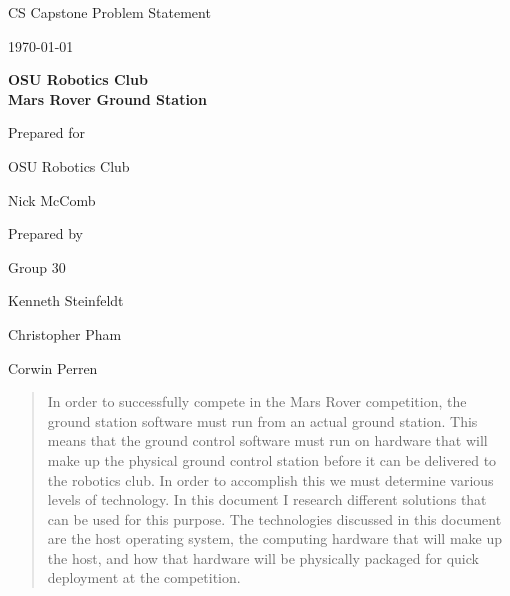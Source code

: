 \documentclass[onecolumn, draftclsnofoot, 10pt, compsoc]{IEEEtran}
\def \CapstoneTeamName{			}
\def \CapstoneTeamNumber{		30}
\def \GroupMemberOne{			Kenneth Steinfeldt}
\def \GroupMemberTwo{			Christopher Pham}
\def \GroupMemberThree{			Corwin Perren}
\def \CapstoneProjectName{		OSU Robotics Club\\Mars Rover Ground Station}
\def \CapstoneSponsorCompany{	OSU Robotics Club}
\def \CapstoneSponsorPerson{	Nick McComb}
\def \DocType{	Problem Statement
			 }
\newcommand{\NameSigPair}[1]{
  \par
  \makebox[2.75in][r]{#1} 
  \hfill
  \makebox[3.25in]{
      \makebox[2.25in]{\hrulefill} 
      \hfill
      \makebox[.75in]{\hrulefill}
  }
  \par\vspace{-12pt} 
  \textit{
      \tiny\noindent
      \makebox[2.75in]{} 
      \hfill
      \makebox[3.25in]{
          \makebox[2.25in][r]{Signature} 
          \hfill
          \makebox[.75in][r]{Date}
      }
  }
}
\renewcommand{\NameSigPair}[1]{#1}
\begin{document}
\begin{titlepage}
\begin{singlespace}
		\par\vspace{.35in}
		\centering
		\scshape{
			\huge CS Capstone \DocType \par
			{\large\today}\par
			\vspace{.5in}
			\textbf{\Huge\CapstoneProjectName}\par
			\vfill
			{\large Prepared for}\par
			\Huge \CapstoneSponsorCompany\par
			\vspace{5pt}
			{\Large\NameSigPair{\CapstoneSponsorPerson}\par}
			{\large Prepared by }\par
			Group\CapstoneTeamNumber\par
			\vspace{5pt}
			{\Large
				\NameSigPair{\GroupMemberOne}\par
				\NameSigPair{\GroupMemberTwo}\par
				\NameSigPair{\GroupMemberThree}\par
			}
			\vspace{20pt}
		}
		\begin{abstract}
            In order to successfully compete in the Mars Rover competition, the ground station software must run from an actual ground station.
            This means that the ground control software must run on hardware that will make up the physical ground control station before it can be delivered to the robotics club.
            In order to accomplish this we must determine various levels of technology.
            In this document I research different solutions that can be used for this purpose.
            The technologies discussed in this document are the host operating system, the computing hardware that will make up the host, and how that hardware will be physically packaged for quick deployment at the competition.
            
		\end{abstract}
	\end{singlespace}
\end{titlepage}
\newpage
{}
\tableofcontents
\clearpage
\end{document}

